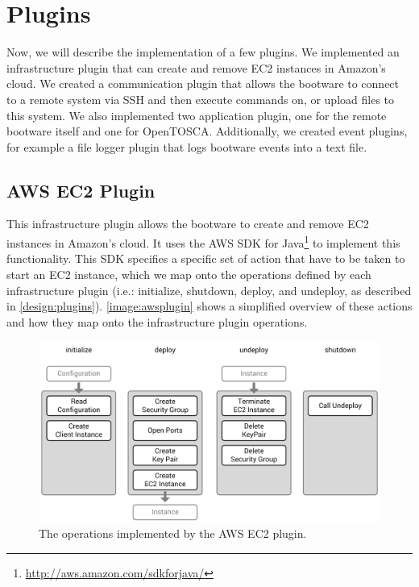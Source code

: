 \section{Plugins}
\label{implementation:plugins}

Now, we will describe the implementation of a few plugins.
We implemented an infrastructure plugin that can create and remove EC2 instances in Amazon's cloud.
We created a communication plugin that allows the bootware to connect to a remote system via SSH and then execute commands on, or upload files to this system.
We also implemented two application plugin, one for the remote bootware itself and one for OpenTOSCA.
Additionally, we created event plugins, for example a file logger plugin that logs bootware events into a text file.

\subsection{AWS EC2 Plugin}

This infrastructure plugin allows the bootware to create and remove EC2 instances in Amazon's cloud.
It uses the AWS SDK for Java\footnote{\url{http://aws.amazon.com/sdkforjava/}} to implement this functionality.
This SDK specifies a specific set of action that have to be taken to start an EC2 instance, which we map onto the operations defined by each infrastructure plugin (i.e.: initialize, shutdown, deploy, and undeploy, as described in \autoref{design:plugins}).
\autoref{image:awsplugin} shows a simplified overview of these actions and how they map onto the infrastructure plugin operations.

\begin{figure}[!htbp]
	\centering
	\includegraphics[resolution=600]{implementation/assets/aws_plugin}
	\caption{The operations implemented by the AWS EC2 plugin.}
	\label{image:awsplugin}
\end{figure}

